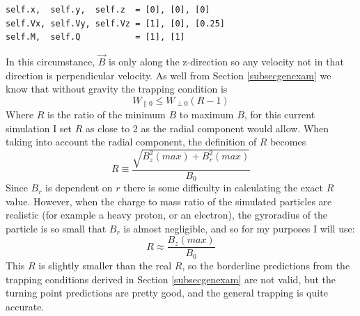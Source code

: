 \documentclass[12pt]{article}
\begin{document}
\begin{verbatim}
self.x,  self.y,  self.z  = [0], [0], [0]
self.Vx, self.Vy, self.Vz = [1], [0], [0.25]
self.M,  self.Q           = [1], [1]
\end{verbatim}
In this circumstance, $\vec{B}$ is only along the z-direction so any velocity not in that direction is perpendicular velocity. As well from Section \ref{subsecgenexam} we know that without gravity the trapping condition is
$$W_{\parallel0}\leq W_{\perp0}(R-1)$$
Where $R$ is the ratio of the minimum $B$ to maximum $B$, for this current simulation I set $R$ as close to 2 as the radial component would allow. When taking into account the radial component, the definition of $R$ becomes
$$R\equiv\frac{\sqrt{B_z^2(max)+B_r^2(max)}}{B_0}$$
Since $B_r$ is dependent on $r$ there is some difficulty in calculating the exact $R$ value. However, when the charge to mass ratio of the simulated particles are realistic (for example a heavy proton, or an electron), the gyroradius of the particle is so small that $B_r$ is almost negligible, and so for my purposes I will use:
\begin{equation}\label{approxR}
R\approx\frac{B_z(max)}{B_0}
\end{equation}
This $R$ is slightly smaller than the real $R$, so the borderline predictions from the trapping conditions derived in Section \ref{subsecgenexam} are not valid, but the turning point predictions are pretty good, and the general trapping is quite accurate.
\end{document}
